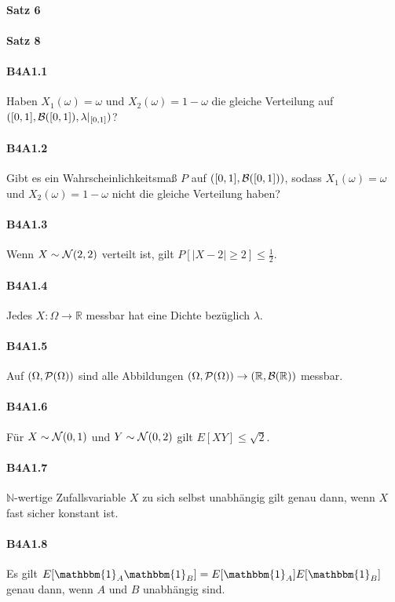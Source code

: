 \documentclass{article}
\begin{document}
\paragraph{Satz 6}
\paragraph{Satz 8}
\paragraph{B4A1.1}
Haben $X_1(\omega)=\omega$ und $X_2(\omega)=1-\omega$ die gleiche Verteilung auf $([0,1],{\cal B}([0,1]),\lambda|_{[0,1]})$?
\paragraph{B4A1.2}
Gibt es ein Wahrscheinlichkeitsmaß $P$ auf $([0,1],{\cal B}([0,1]))$, sodass $X_1(\omega)=\omega$ und $X_2(\omega)=1-\omega$ nicht die gleiche Verteilung haben?
\paragraph{B4A1.3}
Wenn $X\sim{\cal N}(2,2)$ verteilt ist, gilt $P[|X-2|\geq2]\leq\frac{1}{2}$.
\paragraph{B4A1.4}
Jedes $X\colon \Omega\to\mathbb{R}$ messbar hat eine Dichte bezüglich $\lambda$.
\paragraph{B4A1.5}
Auf $(\Omega,{\cal P}(\Omega))$ sind alle Abbildungen $(\Omega,{\cal P}(\Omega))\to(\mathbb{R},{\cal B}(\mathbb{R}))$ messbar.
\paragraph{B4A1.6}
Für $X\sim{\cal N}(0,1)$ und $Y\sim{\cal N}(0,2)$ gilt $E[XY]\leq\sqrt{2}$.
\paragraph{B4A1.7}
$\mathbb{N}$-wertige Zufallsvariable $X$ zu sich selbst unabhängig gilt genau dann, wenn $X$ fast sicher konstant ist.
\paragraph{B4A1.8}
Es gilt $E[\mathbbm{1}_A\mathbbm{1}_B]=E[\mathbbm{1}_A]E[\mathbbm{1}_B]$ genau dann, wenn $A$ und $B$ unabhängig sind.
\end{document}
